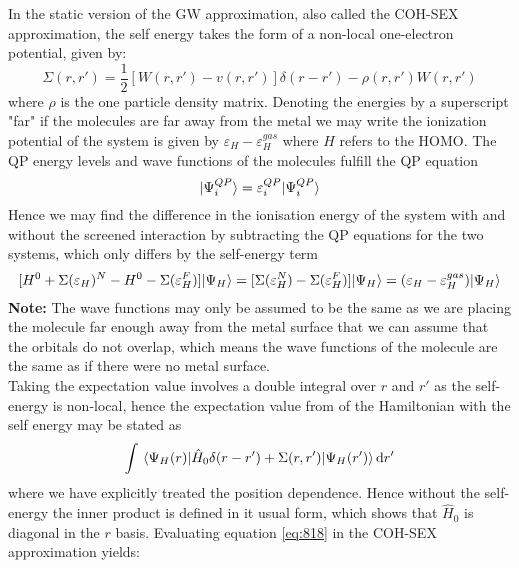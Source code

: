 \begin{solution}
In the static version of the GW approximation, also called the COH-SEX approximation, the self energy takes the form of a non-local one-electron potential, given by:
\begin{equation}
    \Sigma(r,r') = \dfrac{1}{2}[W(r,r') - v(r,r')]\delta(r-r') - \rho(r,r')W(r,r')
\end{equation}
where $\rho$ is the one particle density matrix. 
Denoting the energies by a superscript "far" if the molecules are far away from the metal we may write the ionization potential of the system is given by $\varepsilon_H - \varepsilon_H^{gas}$ where $H$ refers to the HOMO. The QP energy levels and wave functions of the molecules fulfill the QP equation
\begin{equation}
    [H^{0} + \Sigma(\varepsilon_i^{QP})(r,r')]\ket{\Psi_i^{QP}} = \varepsilon_i^{QP}\ket{\Psi_i^{QP}}
\end{equation}
Hence we may find the difference in the ionisation energy of the system with and without the screened interaction by subtracting the QP equations for the two systems, which only differs by the self-energy term
\begin{equation}\label{eq:818}
    [H^{0} + \Sigma(\varepsilon_H)^{N} - H^{0} - \Sigma(\varepsilon_H^{F})]|\Psi_H\rangle = [\Sigma(\varepsilon_H^{N})-\Sigma(\varepsilon_H^{F})]|\Psi_H\rangle = (\varepsilon_H - \varepsilon_H^{gas})|\Psi_H\rangle
\end{equation}
\textbf{Note:} The wave functions may only be assumed to be the same as we are placing the molecule far enough away from the metal surface that we can assume that the orbitals do not overlap, which means the wave functions of the molecule are the same as if there were no metal surface. \\
Taking the expectation value involves a double integral over $r$ and $r'$ as the self-energy is non-local, hence the expectation value from of the Hamiltonian with the self energy may be stated as
\begin{equation}
    \int \mel{\Psi_{H}(r)}{\hat{H}_0\delta(r-r') +\Sigma(r,r')}{\Psi_H(r')}\mathrm{d}r'
\end{equation}
where we have explicitly treated the position dependence. Hence without the self-energy the inner product is defined in it usual form, which shows that $\hat{H}_0$ is diagonal in the $r$ basis. Evaluating equation \ref{eq:818} in the COH-SEX approximation yields:
\begin{equation}\label{eq:image_ionization}

\end{equation}
\end{solution}
